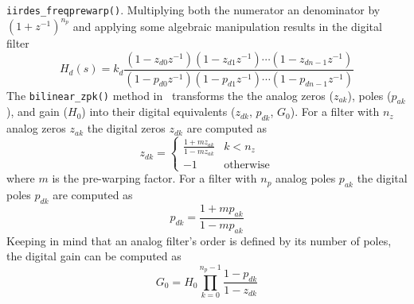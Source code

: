 {\tt iirdes\_freqprewarp()}.
Multiplying both the numerator an denominator by $(1+z^{-1})^{n_p}$ and
applying some algebraic manipulation results in the digital filter
%
\begin{equation}
\label{eqn:filter:iirdes:Hd}
    H_d(s) = k_d
            \frac{
                (1-z_{d0}z^{-1})(1-z_{d1}z^{-1})\cdots(1-z_{dn-1}z^{-1})
            }{
                (1-p_{d0}z^{-1})(1-p_{d1}z^{-1})\cdots(1-p_{dn-1}z^{-1})
            }
\end{equation}
%
The {\tt bilinear\_zpk()} method in \liquid\ transforms
the the analog zeros ($z_{ak}$),
poles ($p_{ak}$), and gain ($H_0$) into
their digital equivalents
($z_{dk}$, $p_{dk}$, $G_0$).
For a filter with $n_z$ analog zeros $z_{ak}$
the digital zeros $z_{dk}$ are computed as
%
\begin{equation}
\label{eqn:filter:iirdes:bilinear_zeros}
    z_{dk} =
        \begin{cases}
        \frac{1 + m z_{ak}}{1 - m z_{ak}}   & k < n_z \\
        -1                                  & \text{otherwise}
        \end{cases}
\end{equation}
%
where $m$ is the pre-warping factor.
For a filter with $n_p$ analog poles $p_{ak}$
the digital poles $p_{dk}$ are computed as
%
\begin{equation}
\label{eqn:filter:iirdes:bilinear_poles}
    p_{dk} = \frac{1 + m p_{ak}}{1 - m p_{ak}}
\end{equation}
%
Keeping in mind that an analog filter's order is defined by its number
of poles,
the digital gain can be computed as
%
\begin{equation}
\label{eqn:filter:iirdes:bilinear_gain}
    G_0 = H_0 \prod_{k=0}^{n_p-1}{ \frac{1 - p_{dk}}{1 - z_{dk}} }
\end{equation}
%

% 
%
